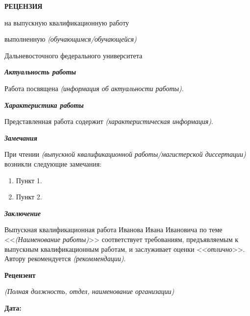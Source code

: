 \documentclass[12pt, a4paper, titlepage]{extarticle}
\begin{document}
	\drawtitle
	\pagestyle{empty}

	\vspace*{-10pt}

	\begin{center}

		\textbf{РЕЦЕНЗИЯ}

		\vspace*{-4pt}
		на выпускную квалификационную работу


		\vspace*{4pt}
		выполненную \textit{(обучающимся/обучающейся)} 

		\vspace*{-4pt}
		Дальневосточного федерального университета

		\vspace{5pt}

	\end{center}

	\textbf{\textit{Актуальность работы}}

		Работа посвящена \textit{(информация об актуальности работы)}.

	\textbf{\textit{Характеристика работы}}

		Представленная работа содержит \textit{(характеристическая информация)}.

	\textbf{\textit{Замечания}}

		При чтении \textit{(выпускной квалификационной работы/магистерской диссертации)} возникли следующие замечания:
		\begin{enumerate}
			\item Пункт 1.
			
			\item Пункт 2.
		\end{enumerate}

	\textbf{\textit{Заключение}}

		Выпускная квалификационная работа Иванова Ивана Ивановича по теме <<\textit{(Наименование работы)}>> соответствует требованиям, предъявляемым к выпускным квалификационным работам, и заслуживает оценки <<\textit{отлично}>>. Автору рекомендуется \textit{(рекоммендации)}.

	\textbf{Рецензент}

	\noindent \textit{(Полная должность, отдел, наименование организации)}

	\vspace{10pt}

	\hfill {}

	\vspace{10pt}
	\textbf{Дата:} 
	\vspace{5pt}

	\vspace{35pt}
\end{document}
